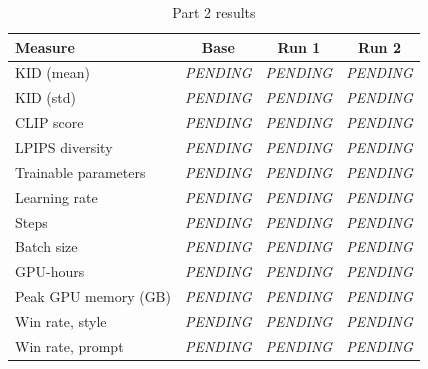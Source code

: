 \begin{table}[!t]
\centering
\caption{Part 2 results}
\label{tab:p2}
\begin{tabular}{lccc}
\hline
Measure & Base & Run 1 & Run 2 \\
\hline
KID (mean) & \textit{PENDING} & \textit{PENDING} & \textit{PENDING} \\
KID (std) & \textit{PENDING} & \textit{PENDING} & \textit{PENDING} \\
CLIP score & \textit{PENDING} & \textit{PENDING} & \textit{PENDING} \\
LPIPS diversity & \textit{PENDING} & \textit{PENDING} & \textit{PENDING} \\
Trainable parameters & \textit{PENDING} & \textit{PENDING} & \textit{PENDING} \\
Learning rate & \textit{PENDING} & \textit{PENDING} & \textit{PENDING} \\
Steps & \textit{PENDING} & \textit{PENDING} & \textit{PENDING} \\
Batch size & \textit{PENDING} & \textit{PENDING} & \textit{PENDING} \\
GPU-hours & \textit{PENDING} & \textit{PENDING} & \textit{PENDING} \\
Peak GPU memory (GB) & \textit{PENDING} & \textit{PENDING} & \textit{PENDING} \\
Win rate, style & \textit{PENDING} & \textit{PENDING} & \textit{PENDING} \\
Win rate, prompt & \textit{PENDING} & \textit{PENDING} & \textit{PENDING} \\
\hline
\end{tabular}
\end{table}
